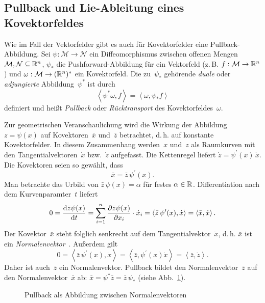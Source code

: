 \subsection{Pullback und Lie-Ableitung eines Kovektorfeldes\label{subsec:Lie-Ableitung-Kovektorfeld}}

Wie im Fall der Vektorfelder gibt es auch für Kovektorfelder eine
Pullback-Abbildung. Sei $\psi:\mathcal{M}\to\mathcal{N}$ ein Diffeomorphismus
zwischen offenen Mengen $\mathcal{M},\mathcal{N}\subseteq{\mathbb{R}}^{n}$,
$\psi_{*}$ die Push\-forward-Abbildung für ein Vektorfeld (z.\,B.
$f:\mathcal{M}\to{\mathbb{R}}^{n}$) und $\omega:\mathcal{M}\to({\mathbb{R}}^{n})^{*}$
ein Kovektorfeld. Die zu~$\psi_{*}$ gehörende \emph{duale} oder
\emph{adjungierte} Abbildung~$\psi^{*}$ ist durch 
\[
\left\langle \psi^{*}\omega,f\right\rangle =\left\langle \omega,\psi_{*}f\right\rangle 
\]
definiert und heißt \emph{Pullback}
oder \emph{Rücktransport}
des Kovektorfeldes~$\omega$. 

\begin{remark}
Zur geometrischen Veranschaulichung wird die Wirkung der Abbildung
$z=\psi(x)$ auf Kovektoren~$\bar{x}$ und~$\bar{z}$ betrachtet,
d.\,h. auf konstante Kovektorfelder. In diesem Zusammenhang werden~$x$
und~$z$ als Raumkurven mit den Tangentialvektoren~$\dot{x}$ bzw.~$\dot{z}$
aufgefasst. Die Kettenregel liefert $\dot{z}=\psi^{\prime}(x)\,\dot{x}$.
Die Kovektoren seien so gewählt, dass 
\[
\bar{x}=\bar{z}\,\psi^{\prime}(x).
\]
Man betrachte das Urbild von $\bar{z}\,\psi(x)=\alpha$ für festes
$\alpha\in{\mathbb{R}}$. Differentiation nach dem Kurvenparamter~$t$ liefert
\[
0=\frac{{\mathrm{d}}\bar{z}\psi(x)}{{\mathrm{d}} t}=\sum_{i=1}^{n}\frac{\partial\bar{z}\psi(x)}{\partial x_{i}}\cdot\dot{x}_{i}=\left\langle \bar{z}\,\psi^{\prime}(x),\dot{x}\right\rangle =\left\langle \bar{x},\dot{x}\right\rangle .
\]
Der Kovektor~$\bar{x}$ steht folglich senkrecht auf dem Tangentialvektor~$\dot{x}$,
d.\,h. $\bar{x}$ ist ein \emph{Normalen\-vektor}~\cite[Abschnitt~{3.2}]{griewank2008}.
Außerdem gilt 
\[
0=\left\langle \bar{z}\,\psi^{\prime}(x),\dot{x}\right\rangle =\left\langle \bar{z},\psi^{\prime}(x)\dot{x}\right\rangle =\left\langle \bar{z},\dot{z}\right\rangle .
\]
Daher ist auch~$\bar{z}$ ein Normalenvektor. Pullback bildet den
Normalen\-vektor~$\bar{z}$ auf den Normalen\-vektor~$\bar{x}$
ab: $\bar{x}=\psi^{*}\bar{z}=\bar{z}\,\psi_{*}$ (siehe Abb.~\ref{fig:Pull-Back-Normalenvektoren}).

\begin{figure}
\begin{centering}
\resizebox{0.65\textwidth}{!}{}
\par\end{centering}
\caption{Pullback als Abbildung zwischen Normalenvektoren\label{fig:Pull-Back-Normalenvektoren}}
\end{figure}
\end{remark}

